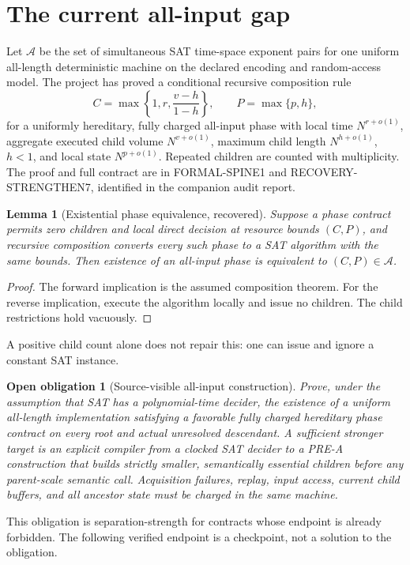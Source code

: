 \documentclass[11pt]{article}
\newtheorem{lemma}{Lemma}
\newtheorem{obligation}{Open obligation}
\begin{document}
\section{The current all-input gap}
Let $\mathcal A$ be the set of simultaneous SAT time-space exponent
pairs for one uniform all-length deterministic machine on the declared
encoding and random-access model. The project has proved a conditional
recursive composition rule
\[
 C=\max\left\{1,r,\frac{v-h}{1-h}\right\},\qquad
 P=\max\{p,h\},
\]
for a uniformly hereditary, fully charged all-input phase with local
time $N^{r+o(1)}$, aggregate executed child volume $N^{v+o(1)}$,
maximum child length $N^{h+o(1)}$, $h<1$, and local state
$N^{p+o(1)}$. Repeated children are counted with multiplicity.
The proof and full contract are in FORMAL-SPINE1 and
RECOVERY-STRENGTHEN7, identified in the companion audit report.

\begin{lemma}[Existential phase equivalence, recovered]
Suppose a phase contract permits zero children and local direct decision
at resource bounds $(C,P)$, and recursive composition converts every
such phase to a SAT algorithm with the same bounds. Then existence of
an all-input phase is equivalent to $(C,P)\in\mathcal A$.
\end{lemma}
\begin{proof}
The forward implication is the assumed composition theorem.
For the reverse implication, execute the algorithm locally and issue no
children. The child restrictions hold vacuously.
\end{proof}
A positive child count alone does not repair this: one can issue and
ignore a constant SAT instance.

\begin{obligation}[Source-visible all-input construction]
Prove, under the assumption that SAT has a polynomial-time decider, the
existence of a uniform all-length implementation satisfying a favorable
fully charged hereditary phase contract on every root and actual
unresolved descendant. A sufficient stronger target is an explicit
compiler from a clocked SAT decider to a PRE-A construction that builds
strictly smaller, semantically essential children before any parent-scale
semantic call. Acquisition failures, replay, input access, current child
buffers, and all ancestor state must be charged in the same machine.
\end{obligation}
This obligation is separation-strength for contracts whose endpoint is
already forbidden. The following verified endpoint is a checkpoint,
not a solution to the obligation.
\end{document}
